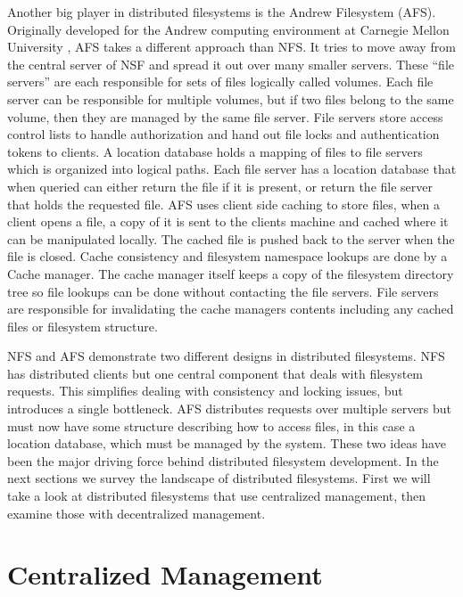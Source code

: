 Another big player in distributed filesystems is the Andrew Filesystem (AFS).
Originally developed for the Andrew computing environment at Carnegie Mellon
University \cite{Howard1988,Howard1988a,Howard1985}, AFS takes a different
approach than NFS. It tries to move away from the central server of NSF and
spread it out over many smaller servers. These “file servers” are each
responsible for sets of files logically called volumes. Each file server can
be responsible for multiple volumes, but if two files belong to the same
volume, then they are managed by the same file server. File servers store
access control lists to handle authorization and hand out file locks and
authentication tokens to clients. A location database holds a mapping of files
to file servers which is organized into logical paths. Each file server has a
location database that when queried can either return the file if it is
present, or return the file server that holds the requested file. AFS uses
client side caching to store files, when a client opens a file, a copy of it
is sent to the clients machine and cached where it can be manipulated locally.
The cached file is pushed back to the server when the file is closed. Cache
consistency and filesystem namespace lookups are done by a Cache manager. The
cache manager itself keeps a copy of the filesystem directory tree so file
lookups can be done without contacting the file servers. File servers are
responsible for invalidating the cache managers contents including any cached
files or filesystem structure.

NFS and AFS demonstrate two different designs in distributed filesystems. NFS
has distributed clients but one central component that deals with filesystem
requests. This simplifies dealing with consistency and locking issues, but
introduces a single bottleneck. AFS distributes requests over multiple servers
but must now have some structure describing how to access files, in this case
a location database, which must be managed by the system. These two ideas have
been the major driving force behind distributed filesystem development. In the
next sections we survey the landscape of distributed filesystems. First we
will take a look at distributed filesystems that use centralized management,
then examine those with decentralized management.



\section{Centralized Management}

